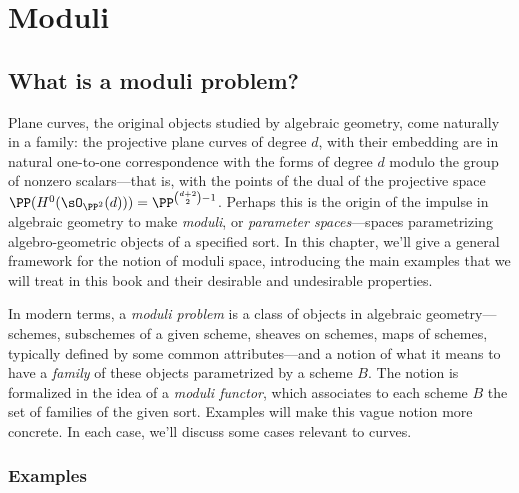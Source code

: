 

\chapter{Moduli} 
\label{Moduli chapter}\label{ModuliChapter}

\section{What is a moduli problem?}

Plane curves, the original objects studied by algebraic geometry, come naturally in a family: the projective plane curves of degree $d$, with their embedding
are in natural one-to-one correspondence with the forms of degree $d$ modulo the group of nonzero scalars---that is, with the points of the dual of the projective space
$ \PP(H^0(\sO_{\PP^2}(d)))=\PP^{\binom{d+2}{2}-1} $.
Perhaps this is the origin of the impulse in algebraic geometry to make 
 \emph{moduli}, or \emph{parameter spaces}---spaces parametrizing algebro-geometric objects of a specified sort. In this chapter, we'll give a general framework for the notion of moduli space, introducing the main examples that we will treat in this book and their desirable and undesirable properties.

In modern terms, a \emph{moduli problem} is a class of objects in algebraic geometry---schemes, subschemes of a given scheme, sheaves on schemes, maps of schemes, typically defined by some common attributes---and a notion of what it means to have a \emph{family} of these objects parametrized by a scheme $B$. The notion is formalized in the idea of a \emph{moduli functor}, 
which associates to each scheme $B$ the set of families of the given sort. Examples will make this vague notion more concrete. In each case, we'll discuss some cases relevant to curves.

\subsection{Examples}

